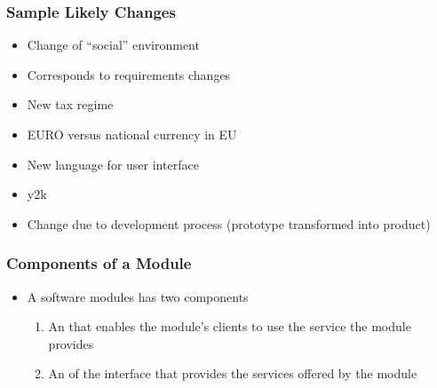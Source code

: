 \documentclass[t,12pt,numbers,fleqn]{beamer}
\begin{document}

\begin{frame}
\frametitle{Sample Likely Changes}

\begin{itemize}

\item Change of ``social'' environment
\bi
\item Corresponds to requirements changes
\item New tax regime
\item EURO versus national currency in EU
\item New language for user interface
\item y2k
\ei
\item Change due to development process (prototype transformed into product)

\end{itemize}

\end{frame}


\begin{frame}
\frametitle{Components of a Module}

\begin{itemize}

\item A software modules has two components
\begin{enumerate}
\item An  that enables the module's clients to use the
  service the module provides
\item An  of the interface that provides the services
  offered by the module
\end{enumerate}

\end{itemize}

\end{frame}

\end{document}

